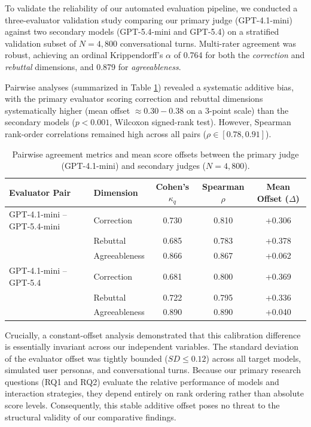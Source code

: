 \documentclass{article}
\begin{document}
To validate the reliability of our automated evaluation pipeline, we conducted a three-evaluator validation study comparing our primary judge (GPT-4.1-mini) against two secondary models (GPT-5.4-mini and GPT-5.4) on a stratified validation subset of $N=4,800$ conversational turns. Multi-rater agreement was robust, achieving an ordinal Krippendorff's $\alpha$ of 0.764 for both the \textit{correction} and \textit{rebuttal} dimensions, and 0.879 for \textit{agreeableness}. 

Pairwise analyses (summarized in Table \ref{tab:evaluator_agreement}) revealed a systematic additive bias, with the primary evaluator scoring correction and rebuttal dimensions systematically higher (mean offset $\approx 0.30 - 0.38$ on a 3-point scale) than the secondary models ($p < 0.001$, Wilcoxon signed-rank test). However, Spearman rank-order correlations remained high across all pairs ($\rho \in [0.78, 0.91]$). 

\begin{table}[htbp]
\centering
\caption{Pairwise agreement metrics and mean score offsets between the primary judge (GPT-4.1-mini) and secondary judges ($N=4,800$).}
\label{tab:evaluator_agreement}
\begin{tabular}{llccc}
\hline
\textbf{Evaluator Pair} & \textbf{Dimension} & \textbf{Cohen's $\kappa_q$} & \textbf{Spearman $\rho$} & \textbf{Mean Offset ($\Delta$)} \\
\hline
GPT-4.1-mini -- GPT-5.4-mini & Correction & 0.730 & 0.810 & +0.306 \\
                             & Rebuttal & 0.685 & 0.783 & +0.378 \\
                             & Agreeableness & 0.866 & 0.867 & +0.062 \\
\hline
GPT-4.1-mini -- GPT-5.4      & Correction & 0.681 & 0.800 & +0.369 \\
                             & Rebuttal & 0.722 & 0.795 & +0.336 \\
                             & Agreeableness & 0.890 & 0.890 & +0.040 \\
\hline
\end{tabular}
\end{table}

Crucially, a constant-offset analysis demonstrated that this calibration difference is essentially invariant across our independent variables. The standard deviation of the evaluator offset was tightly bounded ($SD \le 0.12$) across all target models, simulated user personas, and conversational turns. Because our primary research questions (RQ1 and RQ2) evaluate the relative performance of models and interaction strategies, they depend entirely on rank ordering rather than absolute score levels. Consequently, this stable additive offset poses no threat to the structural validity of our comparative findings.
\end{document}
